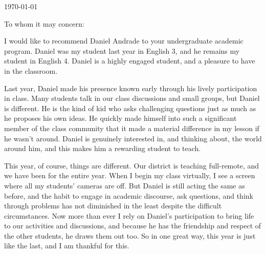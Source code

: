 \documentclass[11pt, letterpaper]{letter} %
\begin{document}

\begin{letter}{
	\today\\	
}


\opening{To whom it may concern:}

I would like to recommend Daniel Andrade to your undergraduate academic program. Daniel was my student last year in English 3, and he remains my student in English 4. Daniel is a highly engaged student, and a pleasure to have in the classroom.

Last year, Daniel made his presence known early through his lively participation in class. Many students talk in our class discussions and small groups, but Daniel is different. He is the kind of kid who asks challenging questions just as much as he proposes his own ideas. He quickly made himself into such a significant member of the class community that it made a material difference in my lesson if he wasn't around. Daniel is genuinely interested in, and thinking about, the world around him, and this makes him a rewarding student to teach.

This year, of course, things are different. Our district is teaching full-remote, and we have been for the entire year. When I begin my class virtually, I see a screen where all my students' cameras are off. But Daniel is still acting the same as before, and the habit to engage in academic discourse, ask questions, and think through problems has not diminished in the least despite the difficult circumstances. Now more than ever I rely on Daniel's participation to bring life to our activities and discussions, and because he has the friendship and respect of the other students, he draws them out too. So in one great way, this year is just like the last, and I am thankful for this.


\end{letter}
\end{document}
